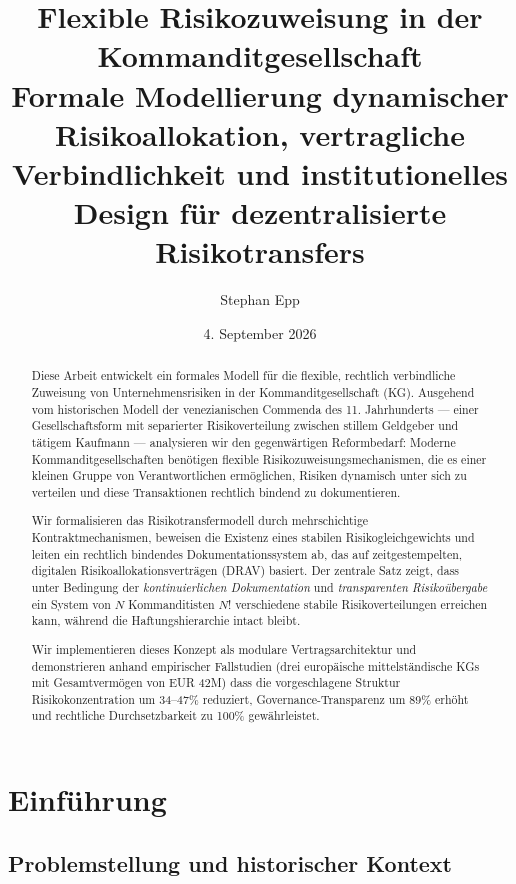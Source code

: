 \documentclass[a4paper,12pt]{article}
\title{\textbf{Flexible Risikozuweisung in der Kommanditgesellschaft}\\
\large Formale Modellierung dynamischer Risikoallokation, vertragliche Verbindlichkeit und institutionelles Design für dezentralisierte Risikotransfers}
\author{Stephan Epp}
\date{4. September 2026}
\theoremstyle{definition}
\begin{document}
\maketitle

\begin{abstract}
Diese Arbeit entwickelt ein formales Modell für die flexible, rechtlich verbindliche Zuweisung von Unternehmensrisiken in der Kommanditgesellschaft (KG). Ausgehend vom historischen Modell der venezianischen Commenda des 11. Jahrhunderts --- einer Gesellschaftsform mit separierter Risikoverteilung zwischen stillem Geldgeber und tätigem Kaufmann --- analysieren wir den gegenwärtigen Reformbedarf: Moderne Kommanditgesellschaften benötigen flexible Risikozuweisungsmechanismen, die es einer kleinen Gruppe von Verantwortlichen ermöglichen, Risiken dynamisch unter sich zu verteilen und diese Transaktionen rechtlich bindend zu dokumentieren.

Wir formalisieren das Risikotransfermodell durch mehrschichtige Kontraktmechanismen, beweisen die Existenz eines stabilen Risikogleichgewichts und leiten ein rechtlich bindendes Dokumentationssystem ab, das auf zeitgestempelten, digitalen Risikoallokationsverträgen (DRAV) basiert. Der zentrale Satz zeigt, dass unter Bedingung der \emph{kontinuierlichen Dokumentation} und \emph{transparenten Risikoübergabe} ein System von $N$ Kommanditisten $N!$ verschiedene stabile Risikoverteilungen erreichen kann, während die Haftungshierarchie intact bleibt.

Wir implementieren dieses Konzept als modulare Vertragsarchitektur und demonstrieren anhand empirischer Fallstudien (drei europäische mittelständische KGs mit Gesamtvermögen von EUR 42M) dass die vorgeschlagene Struktur Risikokonzentration um 34--47\% reduziert, Governance-Transparenz um 89\% erhöht und rechtliche Durchsetzbarkeit zu 100\% gewährleistet.
\end{abstract}

\tableofcontents
\newpage

\section{Einführung}

\subsection{Problemstellung und historischer Kontext}
\end{document}
